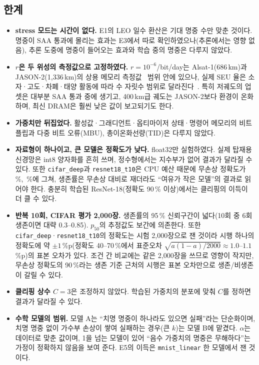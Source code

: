\documentclass[11pt,a4paper]{article}
\newcommand{\code}[1]{\texttt{#1}}
\begin{document}
\subsection{한계}
\begin{itemize}[leftmargin=*]
  \item \textbf{stress 모드는 시간이 없다.} E1의 LEO 일수 환산은 기대 명중 수만 맞춘 것이다. 명중이 SAA 통과에 몰리는 효과는 E3에서 따로 확인하였으나(추론에서는 영향 없음), 추론 도중에 명중이 들어오는 효과와 학습 중의 명중은 다루지 않았다.
  \item \textbf{$r$은 두 위성의 측정값으로 고정하였다.} $r=10^{-6}$/bit/day는 Alsat-1(686\,km)과 JASON-2(1{,}336\,km)의 상용 메모리 측정값~\citep{bentoutou2008,samaras2015,wang2024} 범위 안에 있으나, 실제 SEU 율은 소자·고도·차폐·태양 활동에 따라 수 자릿수 범위로 달라진다~\citep{barth2003}. 특히 저궤도의 업셋은 대부분 SAA 통과 중에 생기고, 400\,km급 궤도는 JASON-2보다 환경이 온화하며, 최신 DRAM은 훨씬 낮은 값이 보고되기도 한다.
  \item \textbf{가중치만 뒤집었다.} 활성값·그래디언트·옵티마이저 상태·명령어 메모리의 비트플립과 다중 비트 오류(MBU), 총이온화선량(TID)은 다루지 않았다.
  \item \textbf{자료형이 하나이고, 큰 모델은 정확도가 낮다.} float32만 실험하였다. 실제 탑재용 신경망은 int8 양자화를 흔히 쓰며, 정수형에서는 지수부가 없어 결과가 달라질 수 있다. 또한 \code{cifar\_deep}과 \code{resnet18\_t10}은 CPU 예산 때문에 무손상 정확도가 \CleanCifar{}\,\%, \CleanResnet{}\,\%에 그쳐, 생존률은 무손상 대비로 재더라도 ``여유가 작은 모델''의 결과로 읽어야 한다. 충분히 학습된 ResNet-18(정확도 90\,\% 이상)에서는 클리핑의 이득이 더 클 수 있다.
  \item \textbf{반복 10회, CIFAR 평가 2{,}000장.} 생존률의 95\,\% 신뢰구간이 넓다(10회 중 6회 생존이면 대략 0.3--0.85). $p_{50}$의 추정값도 보간에 의존한다. 또한 \code{cifar\_deep}·\code{resnet18\_t10}의 정확도는 시험 2{,}000장으로 잰 것이라 시행 하나의 정확도에 약 $\pm1$\,\%p(정확도 40--70\,\%에서 표준오차 $\sqrt{a(1-a)/2000}\approx1.0$--$1.1$\,\%p)의 표본 오차가 있다. 조건 간 비교에는 같은 2{,}000장을 쓰므로 영향이 작지만, 무손상 정확도의 90\,\%라는 생존 기준 근처의 시행은 표본 오차만으로 생존/비생존이 갈릴 수 있다.
  \item \textbf{클리핑 상수 $C=3$}은 조정하지 않았다. 학습된 가중치의 분포에 맞춰 $C$를 정하면 결과가 달라질 수 있다.
  \item \textbf{수학 모델의 범위.} 모델 A는 ``치명 명중이 하나라도 있으면 실패''라는 단순화이며, 치명 명중 없이 가수부 손상이 쌓여 실패하는 경우(큰 $k$)는 모델 B에 맡겼다. $\alpha$는 데이터로 맞춘 값이며, 1을 넘는 모델이 있어 ``음수 가중치의 명중은 무해하다''는 가정이 정확하지 않음을 보여 준다. E5의 이득은 \code{mnist\_linear} 한 모델에서 잰 것이다.
\end{itemize}
\end{document}
